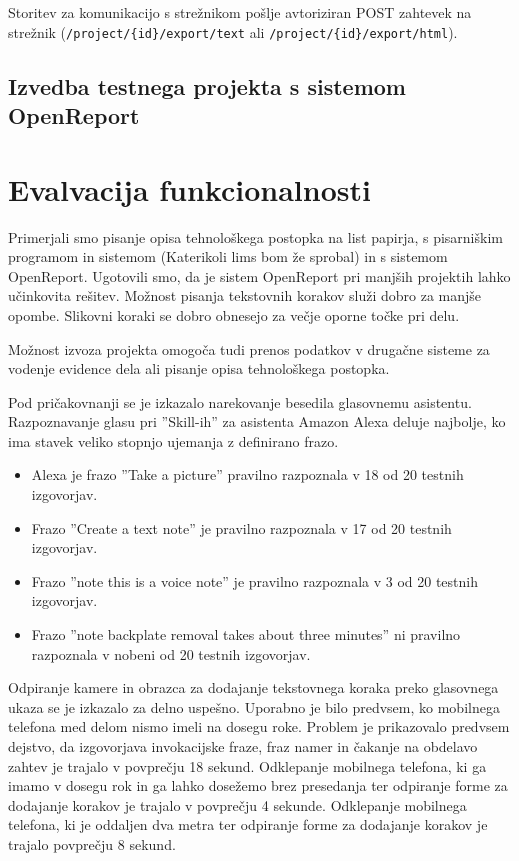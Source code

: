 \documentclass[a4paper, 12pt]{book}
\begin{document}
Storitev za komunikacijo s strežnikom pošlje avtoriziran POST zahtevek na strežnik (\texttt{/project/\{id\}/export/text} ali \texttt{/project/\{id\}/export/html}).

\subsection{Izvedba testnega projekta s sistemom OpenReport}


\section{Evalvacija funkcionalnosti}

Primerjali smo pisanje opisa tehnološkega postopka na list papirja, s pisarniškim programom in sistemom (Katerikoli lims bom že sprobal) in s sistemom OpenReport.
Ugotovili smo, da je sistem OpenReport pri manjših projektih lahko učinkovita rešitev.
Možnost pisanja tekstovnih korakov služi dobro za manjše opombe.
Slikovni koraki se dobro obnesejo za večje oporne točke pri delu.

Možnost izvoza projekta omogoča tudi prenos podatkov v drugačne sisteme za vodenje evidence dela ali pisanje opisa tehnološkega postopka.

Pod pričakovnanji se je izkazalo narekovanje besedila glasovnemu asistentu.
Razpoznavanje glasu pri ''Skill-ih'' za asistenta Amazon Alexa deluje najbolje, ko ima stavek veliko stopnjo ujemanja z definirano frazo.
\begin{itemize}
	\item Alexa je frazo ''Take a picture'' pravilno razpoznala v 18 od 20 testnih izgovorjav.
	\item Frazo ''Create a text note'' je pravilno razpoznala v 17 od 20 testnih izgovorjav.
	\item Frazo ''note this is a voice note'' je pravilno razpoznala v 3 od 20 testnih izgovorjav.
	\item Frazo ''note backplate removal takes about three minutes'' ni pravilno razpoznala v nobeni od 20 testnih izgovorjav.
\end{itemize}

Odpiranje kamere in obrazca za dodajanje tekstovnega koraka preko glasovnega ukaza se je izkazalo za delno uspešno.
Uporabno je bilo predvsem, ko mobilnega telefona med delom nismo imeli na dosegu roke.
Problem je prikazovalo predvsem dejstvo, da izgovorjava invokacijske fraze, fraz namer in čakanje na obdelavo zahtev je trajalo v povprečju 18 sekund.
Odklepanje mobilnega telefona, ki ga imamo v dosegu rok in ga lahko dosežemo brez presedanja ter odpiranje forme za dodajanje korakov je trajalo v povprečju 4 sekunde.
Odklepanje mobilnega telefona, ki je oddaljen dva metra ter odpiranje forme za dodajanje korakov je trajalo povprečju 8 sekund.
\end{document}
